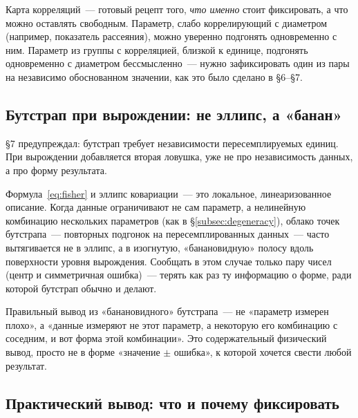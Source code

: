 \begin{intuition}
Карта корреляций~--- готовый рецепт того, \emph{что именно} стоит фиксировать, а что можно
оставлять свободным. Параметр, слабо коррелирующий с диаметром (например, показатель рассеяния),
можно уверенно подгонять одновременно с ним. Параметр из группы с корреляцией, близкой к
единице, подгонять одновременно с диаметром бессмысленно~--- нужно зафиксировать один из пары на
независимо обоснованном значении, как это было сделано в §6--§7.
\end{intuition}

\subsection{Бутстрап при вырождении: не эллипс, а «банан»}
\label{subsec:bootstrap-degenerate}

§7 предупреждал: бутстрап требует независимости пересемплируемых единиц. При вырождении
добавляется вторая ловушка, уже не про независимость данных, а про форму результата.

\begin{warning}
Формула~\eqref{eq:fisher} и эллипс ковариации~--- это локальное, линеаризованное описание. Когда
данные ограничивают не сам параметр, а нелинейную комбинацию нескольких параметров (как в
§\ref{subsec:degeneracy}), облако точек бутстрапа~--- повторных подгонок на пересемплированных
данных~--- часто вытягивается не в эллипс, а в изогнутую, «банановидную» полосу вдоль поверхности
уровня вырождения. Сообщать в этом случае только пару чисел (центр и симметричная ошибка)~---
терять как раз ту информацию о форме, ради которой бутстрап обычно и делают.
\end{warning}

\begin{intuition}
Правильный вывод из «банановидного» бутстрапа~--- не «параметр измерен плохо», а «данные измеряют
не этот параметр, а некоторую его комбинацию с соседним, и вот форма этой комбинации». Это
содержательный физический вывод, просто не в форме «значение $\pm$ ошибка», к которой хочется
свести любой результат.
\end{intuition}

\subsection{Практический вывод: что и почему фиксировать}
\label{subsec:conclusion}

